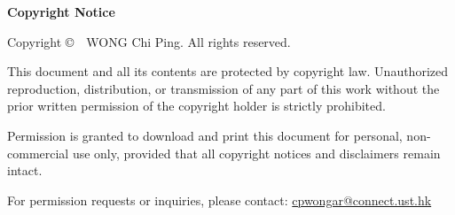 \clearpage
\thispagestyle{empty}
\vspace*{\fill}

\begin{center}
  \textbf{Copyright Notice}
\end{center}

\vspace{2cm}

\noindent
Copyright \copyright\ \the\year\ WONG Chi Ping. All rights reserved.

\vspace{1cm}

\noindent
This document and all its contents are protected by copyright law. Unauthorized reproduction, distribution, or transmission of any part of this work without the prior written permission of the copyright holder is strictly prohibited.

\vspace{1cm}

\noindent
Permission is granted to download and print this document for personal, non-commercial use only, provided that all copyright notices and disclaimers remain intact.

\vspace{1cm}

\noindent
For permission requests or inquiries, please contact: \href{mailto:cpwongar@connect.ust.hk}{cpwongar@connect.ust.hk}

\vspace{\fill}